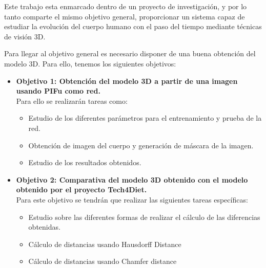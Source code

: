 

Este trabajo esta enmarcado dentro de un proyecto de investigación, y por lo tanto comparte el mismo objetivo general, proporcionar un sistema capaz de estudiar la evolución del cuerpo humano con el paso del tiempo mediante técnicas de visión 3D. 

Para llegar al objetivo general es necesario disponer de una buena obtención del modelo 3D. Para ello, tenemos los siguientes objetivos:


\begin{itemize}
	\item{\textbf{Objetivo 1: Obtención del modelo 3D a partir de una imagen usando PIFu como red.}} 
	\\Para ello se realizarán tareas como:
	\begin{itemize}
		\item Estudio de los diferentes parámetros para el entrenamiento y prueba de la red.
		\item Obtención de imagen del cuerpo y generación de máscara de la imagen.
		\item Estudio de los resultados obtenidos.
		
		
	\end{itemize}
	\item{\textbf{Objetivo 2: Comparativa del modelo 3D obtenido con el modelo obtenido por el proyecto Tech4Diet. }} \\
	Para este objetivo se tendrán que realizar las siguientes tareas específicas:
	\begin{itemize}
		\item Estudio sobre las diferentes formas de realizar el cálculo de las diferencias obtenidas.
		\item Cálculo de distancias usando Hausdorff Distance
		\item Cálculo de distancias usando Chamfer distance
	\end{itemize}
\end{itemize}

\label{sec:Introducción}

